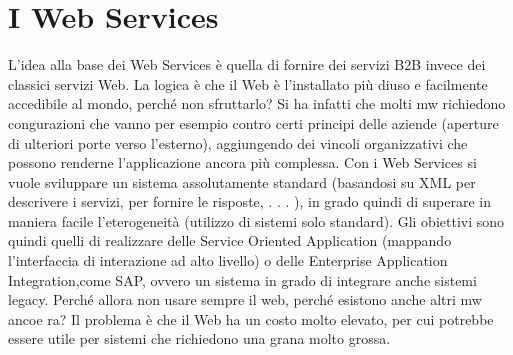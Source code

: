 \section{I Web Services}
L'idea alla base dei Web Services è quella di fornire dei servizi B2B invece dei
classici servizi Web. La logica è che il Web è l'installato più diuso e facilmente
accedibile al mondo, perché non sfruttarlo?
Si ha infatti che molti mw richiedono congurazioni che vanno per esempio
contro certi principi delle aziende (aperture di ulteriori porte verso l'esterno),
aggiungendo dei vincoli organizzativi che possono renderne l'applicazione ancora
più complessa.
Con i Web Services si vuole sviluppare un sistema assolutamente standard
(basandosi su XML per descrivere i servizi, per fornire le risposte, . . . ), in grado quindi di superare in maniera
facile l'eterogeneità (utilizzo di sistemi solo
standard). Gli obiettivi sono quindi quelli di realizzare delle Service Oriented
Application (mappando l'interfaccia di interazione ad alto livello) o delle Enterprise Application Integration,come SAP,
ovvero un sistema in grado di integrare
anche sistemi legacy.
Perché allora non usare sempre il web, perché esistono anche altri mw ancoe
ra? Il problema è che il Web ha un costo molto elevato, per cui potrebbe essere
utile per sistemi che richiedono una grana molto grossa.
